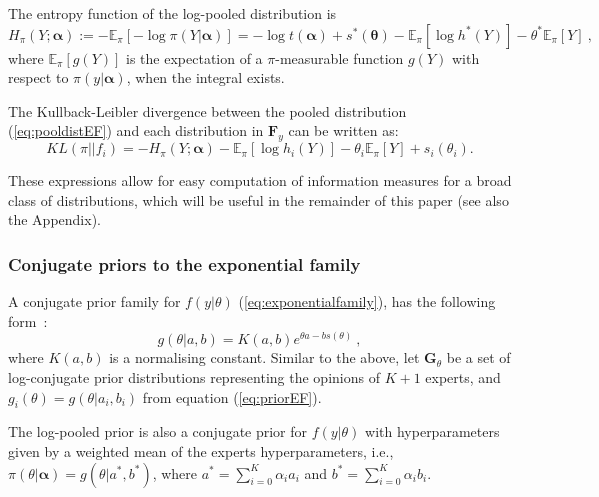 \documentclass[a4paper, notitlepage, 10pt]{article}
\begin{document}
The entropy function of the log-pooled distribution is
\begin{equation}
\label{eq:entropydistEF}
H_\pi(Y; \boldsymbol\alpha) :=  - \mathbb{E}_{\pi}\left[-\log \pi(Y | \boldsymbol\alpha) \right] = -\log t(\boldsymbol\alpha) + s^\ast (\boldsymbol\theta) - \mathbb{E}_\pi[\log h^\ast (Y)] - \theta^\ast \mathbb{E}_\pi[Y] \: ,
\end{equation}
where $\mathbb{E}_{\pi}\left[ g(Y) \right]$ is the expectation of a $\pi$-measurable function $g(Y)$ with respect to $\pi( y | \boldsymbol\alpha)$, when the integral exists.

The Kullback-Leibler divergence between the pooled distribution (\ref{eq:pooldistEF}) and each distribution in $\mathbf{F}_{y}$ can be written as:
\begin{equation}
\label{eq:KLdistEF}
KL(\pi || f_i )  =  - H_\pi(Y; \boldsymbol\alpha) - \mathbb{E}_\pi[\log h_i(Y)] - \theta_i \mathbb{E}_\pi[Y] + s_i(\theta_i).
\end{equation}

These expressions allow for easy computation of information measures for a broad class of distributions, which will be useful in the remainder of this paper (see also the Appendix).

\subsubsection{Conjugate priors to the exponential family}
\label{sec:conjugexpofamily}

A conjugate prior family for $f(y|\theta)$ (\ref{eq:exponentialfamily}), has the following form~\citep{Diaconis1979}:
\begin{equation}
\label{eq:priorEF}
g(\theta | a, b) = K(a,b) e^{\theta a - b s(\theta)} \: ,
\end{equation}
where $K(a,b)$ is a normalising constant.
Similar to the above, let $\mathbf{G}_{\theta}$ be a set of log-conjugate prior distributions representing the opinions of $K+1$ experts, and $g_i(\theta) = g(\theta | a_i, b_i)$ from equation (\ref{eq:priorEF}).

The log-pooled prior is also a conjugate prior for $f(y|\theta)$ with hyperparameters given by a weighted mean of the experts hyperparameters, i.e., $\pi(\theta|\boldsymbol\alpha) = g(\theta | a^*, b^* )$, where $a^* = \sum_{i=0}^K \alpha_i a_i$ and $b^* = \sum_{i=0}^K \alpha_i b_i$.
\end{document}

